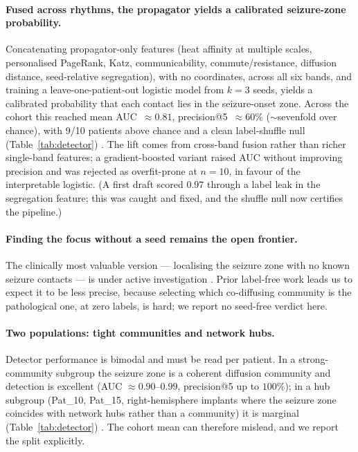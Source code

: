 \documentclass[11pt]{article}
\newcommand{\tab}[1]{Table~\ref{#1}}
\begin{document}
\paragraph{Fused across rhythms, the propagator yields a calibrated seizure-zone
probability.}
Concatenating propagator-only features (heat affinity at multiple scales,
personalised PageRank, Katz, communicability, commute/resistance,
diffusion distance, seed-relative segregation), with no coordinates, across all
six bands, and training a leave-one-patient-out logistic model from $k=3$ seeds,
yields a calibrated probability that each contact lies in the seizure-onset zone.
Across the cohort this reached mean AUC~$\approx0.81$, precision@5~$\approx60\%$
($\sim$sevenfold over chance), with 9/10 patients above chance and a clean
label-shuffle null (\tab{tab:detector})
. The lift comes from cross-band fusion rather than richer single-band features;
a gradient-boosted variant raised AUC without improving precision and was
rejected as overfit-prone at $n=10$, in favour of the interpretable logistic. (A
first draft scored $0.97$ through a label leak in the segregation feature; this
was caught and fixed, and the shuffle null now certifies the pipeline.)

\paragraph{Finding the focus without a seed remains the open frontier.}
The clinically most valuable version --- localising the seizure zone with no
known seizure contacts --- is under active investigation
. Prior label-free work leads us to expect it to be less precise, because
selecting which co-diffusing community is the pathological one, at zero labels,
is hard; we report no seed-free verdict here.

\paragraph{Two populations: tight communities and network hubs.}
Detector performance is bimodal and must be read per patient. In a
strong-community subgroup the seizure zone is a coherent diffusion community and
detection is excellent (AUC $\approx0.90$--$0.99$, precision@5 up to $100\%$); in
a hub subgroup (Pat\_10, Pat\_15, right-hemisphere implants where the seizure
zone coincides with network hubs rather than a community) it is marginal
(\tab{tab:detector})
. The cohort mean can therefore mislead, and we report the split explicitly.
\end{document}
